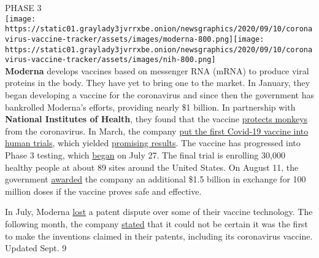 PHASE 3\\
\texttt{[image: https://static01.graylady3jvrrxbe.onion/newsgraphics/2020/09/10/coronavirus-vaccine-tracker/assets/images/moderna-800.png]}\texttt{[image: https://static01.graylady3jvrrxbe.onion/newsgraphics/2020/09/10/coronavirus-vaccine-tracker/assets/images/nih-800.png]}\\
\textbf{\textbf{Moderna}} develops vaccines based on messenger RNA
(mRNA) to produce viral proteins in the body. They have yet to bring one
to the market. In January, they began developing a vaccine for the
coronavirus and since then the government has bankrolled Moderna's
efforts, providing nearly \$1 billion. In partnership with
\textbf{\textbf{National Institutes of Health}}, they found that the
vaccine
\href{https://www.nytimes3xbfgragh.onion/2020/07/28/health/coronavirus-moderna-vaccine-monkeys.html}{protects
monkeys} from the coronavirus. In March, the company
\href{https://www.nytimes3xbfgragh.onion/2020/03/16/health/coronavirus-vaccine.html}{put
the first Covid-19 vaccine into human trials}, which yielded
\href{https://www.nytimes3xbfgragh.onion/2020/07/14/world/coronavirus-update.html\#link-751c8321}{promising
results}. The vaccine has progressed into Phase 3 testing, which
\href{https://www.nytimes3xbfgragh.onion/2020/07/27/world/coronavirus-covid-19.html\#link-6509720d}{began}
on July 27. The final trial is enrolling 30,000 healthy people at about
89 sites around the United States. On August 11, the government
\href{https://www.businesswire.com/news/home/20200811005852/en/Moderna-Announces-Supply-Agreement-U.S.-Government-Initial}{awarded}
the company an additional \$1.5 billion in exchange for 100 million
doses if the vaccine proves safe and effective.

In July, Moderna
\href{https://www.nytimes3xbfgragh.onion/reuters/2020/08/11/us/11reuters-health-coronavirus-moderna.html?searchResultPosition=1}{lost}
a patent dispute over some of their vaccine technology. The following
month, the company
\href{https://www.axios.com/moderna-coronavirus-vaccine-sec-disclosure-c8c491d1-0395-4c9d-8bf4-792246c6aa34.html}{stated}
that it could not be certain it was the first to make the inventions
claimed in their patents, including its coronavirus vaccine.\\
Updated Sept. 9

